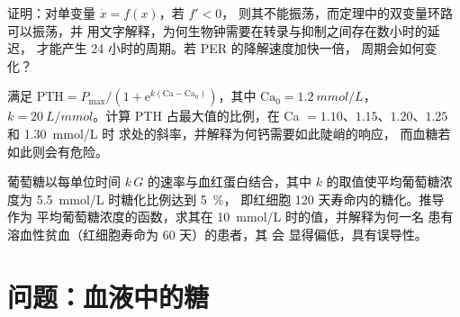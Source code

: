 \begin{exercise}[$\star\star\star$]\label{exo:b3:endocrinology:10}
证明：对单变量 $\dot x = f(x)$，若 $f' < 0$，
则其不能振荡，而定理中的双变量环路可以振荡，并
用文字解释，为何生物钟需要在转录与抑制之间存在数小时的延迟，
才能产生 24 小时的周期。若 PER 的降解速度加快一倍，
周期会如何变化？
\end{exercise}

\begin{exercise}[$\star\star\star$]\label{exo:b3:endocrinology:11}
满足 $\text{PTH} = P_{\max}/(1 +
\mathrm{e}^{k(\text{Ca} - \text{Ca}_{0})})$，其中 $\text{Ca}_{0} =
\qty{1.2}{mmol/L}$，$k = \qty{20}{L/mmol}$。计算 PTH
占最大值的比例，在 Ca $= 1.10$、$1.15$、$1.20$、$1.25$ 和 \qty{1.30}{mmol/L} 时
求处的斜率，并解释为何钙需要如此陡峭的响应，
而血糖若如此则会有危险。
\end{exercise}

\begin{exercise}[$\star\star\star$]\label{exo:b3:endocrinology:12}
葡萄糖以每单位时间 $k\,G$ 的速率与血红蛋白结合，其中
$k$ 的取值使平均葡萄糖浓度为 \qty{5.5}{mmol/L} 时糖化比例达到 \qty{5}{\%}，
即红细胞 120 天寿命内的糖化。推导  作为
平均葡萄糖浓度的函数，求其在 \qty{10}{mmol/L} 时的值，并解释为何一名
患有溶血性贫血（红细胞寿命为 60 天）的患者，其  会
显得偏低，具有误导性。
\end{exercise}

\section{问题：血液中的糖}

